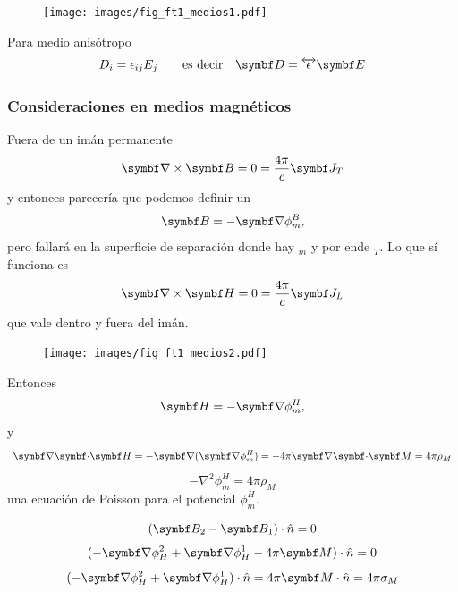 \documentclass[10pt,oneside]{CBFT_book}
\begin{document}
\begin{figure}[htb]
	\begin{center}
	\texttt{[image: images/fig\_ft1\_medios1.pdf]}	 
	\end{center}
	\caption{}
\end{figure}

Para medio anisótropo
\[
	D_i = \epsilon_{ij} E_j \qquad \text{es decir} \quad \vb{D} = \overleftrightarrow{\epsilon} \vb{E}
\]

\subsubsection{Consideraciones en medios magnéticos}

Fuera de un imán permanente 
\[
	\rotorm{B} = 0 = \frac{4\pi}{c}\vb{J}_T
\]
y entonces parecería que podemos definir un
\[
	\vb{B} = -\Nabla \phi_m^B,
\]
pero fallará en la superficie de separación donde hay $_m$ y por ende $_T$. Lo que sí funciona
es
\[
	\rotorm{H} = 0 = \frac{4\pi}{c}\vb{J}_L
\]
que vale dentro y fuera del imán.
\begin{figure}[htb]
	\begin{center}
	\texttt{[image: images/fig\_ft1\_medios2.pdf]}	 
	\end{center}
	\caption{}
\end{figure}

Entonces
\[
	\vb{H} = -\Nabla \phi_m^H,
\]
y
\[
	\divem{H} = -\Nabla(\Nabla \phi^H_m ) = -4\pi \divem{M} = 4\pi\rho_M
\]
\[
	-\nabla^2 \phi_m^H = 4\pi\rho_M
\]
una ecuación de Poisson para el potencial $\phi_m^H$.

\[
	(\vb{B}_2 - \vb{B}_1)\cdot\hat{n} = 0
\]
\[
	(-\Nabla \phi^2_H + \Nabla \phi^1_H - 4\pi \vb{M})\cdot\hat{n} = 0
\]
\[
	(-\Nabla \phi^2_H + \Nabla \phi^1_H )\cdot\hat{n} = 4\pi \vb{M}\cdot\hat{n} = 4\pi \sigma_M
\]
\end{document}
